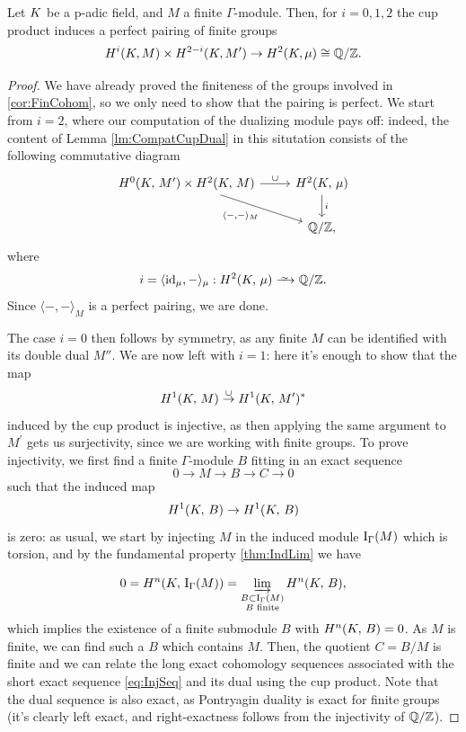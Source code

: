 \documentclass[a4paper, oneside]{memoir}
\begin{document}
\begin{theorem}
	Let $K$ be a p-adic field, and $M$ a finite $\Gamma$-module.
	Then, for $i=0,1,2$ the cup product induces a perfect pairing of finite groups
	\begin{equation*}
		H^i(K, M) \times H^{2-i}(K, M^{\prime}) \to H^2(K, \mu) \cong \mathbb{Q}/\mathbb{Z}.
	\end{equation*}
\end{theorem}
\begin{proof}
	We have already proved the finiteness of the groups involved in \ref{cor:FinCohom}, so we only need to show that the pairing is perfect.
	We start from $i=2$, where our computation of the dualizing module pays off: indeed, the content of Lemma \ref{lm:CompatCupDual}
	in this situtation consists of the following commutative diagram
	\begin{equation*}
		\begin{tikzcd}
			{\H{0}{\K}{M^\prime}  \times \HH{\K}{M}} \ar[swap, rd, "\langle - {,} - \rangle_M "] \ar[r, "\cup"] & \HH{\K}{\mu} \ar[d, "i"] \\
			& \Q/\Z,
		\end{tikzcd}
	\end{equation*}
	where
	\[
		i = \langle \id_{\mu}, - \rangle_\mu : \H{2}{\K}{\mu} \Iso \Q/\Z.
	\]
	Since \(\langle -{,}- \rangle_M\) is a perfect pairing, we are done.

	The case $i=0$ then follows by symmetry, as any finite $M$ can be identified with its double dual $M''$.
	We are now left with $i=1$: here it's enough to show that the map
	\[
		H^{1}( K, \, M ) \overset{\cup}{\to} H^{1}( K, \, M^\prime )^*
	\]
	induced by the cup product is injective, as then applying the same argument to $M^\prime$ gets us surjectivity, since we are working with finite groups.
	To prove injectivity, we first find a finite $\Gamma$-module $B$ fitting in an exact sequence
	\begin{equation}\label{eq:InjSeq}
		0\to M\to B\to C\to 0
	\end{equation}
	such that the induced map
	\[
		H^{1}( K, \, B )\to H^{1}( K, \, B )
	\]
	is zero:
	as usual, we start by injecting $M$ in the induced module $\operatorname{I}_{\Gamma}(M)$ which is torsion, and by the fundamental property \ref{thm:IndLim} we have

	\[
		0=H^{n}( K, \, \operatorname{I}_{\Gamma}(M) )=\varinjlim_{\substack{B\subset\operatorname{I}_{\Gamma}(M) \\B\text{ finite}}}{H^{n}( K, \, B )},
	\]
	which implies the existence of a finite submodule \(B\) with \(H^{n}( K, \, B )=0\). As \(M\) is finite, we can find such a \(B\) which contains \(M\). Then, the quotient \(C=B/M\) is finite and we can relate the long exact cohomology sequences associated with the short exact sequence \eqref{eq:InjSeq}
	and its dual using the cup product. Note that the dual sequence is also exact, as Pontryagin duality is exact for finite groups (it's clearly left exact, and right-exactness follows from the injectivity of $\mathbb{Q}/\mathbb{Z}$).


\end{proof}
\end{document}
